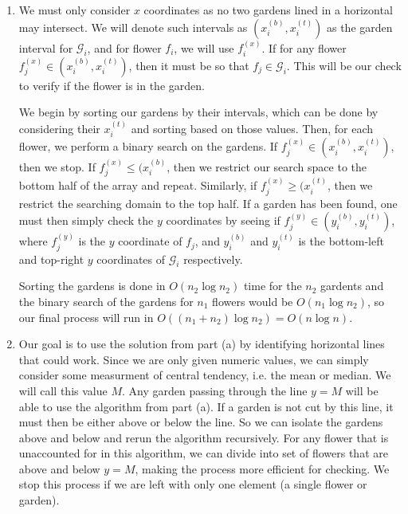 \documentclass{article}
\begin{document}
\begin{solution}
\begin{enumerate}[label = (\alph*)]
    \item We must only consider $x$ coordinates as no two gardens lined in a horizontal may intersect. We will denote such intervals as $(x_i^{(b)}, x_i^{(t)})$ as the garden interval for $\mathcal G_i$, and for flower $f_i$, we will use $f^{(x)}_i$. If for any flower $f_j^{(x)} \in (x_i^{(b)}, x_i^{(t)})$, then it must be so that $f_j \in \mathcal{G}_i$. This will be our check to verify if the flower is in the garden.

We begin by sorting our gardens by their intervals, which can be done by considering their $x^{(t)}_i$ and sorting based on those values. Then, for each flower, we perform a binary search on the gardens. If $f_j^{(x)} \in (x_i^{(b)}, x_i^{(t)})$, then we stop. If $f_j^{(x)}  \leq (x_i^{(b)}$, then we restrict our search space to the bottom half of the array and repeat. Similarly, if $f_j^{(x)}  \geq (x_i^{(t)}$, then we restrict the searching domain to the top half. If a garden has been found, one must then simply check the $y$ coordinates by seeing if $f_j^{(y)} \in (y_i^{(b)}, y_i^{(t)})$, where $f_j^{(y)}$ is the $y$ coordinate of $f_j$, and $y_i^{(b)}$ and $y_i^{(t)}$ is the bottom-left and top-right $y$ coordinates of $\mathcal{G}_i$ respectively.

Sorting the gardens is done in $O(n_2 \log n_2)$ time for the $n_2$ gardents and the binary search of the gardens for $n_1$ flowers would be $O(n_1 \log n_2)$, so our final process will run in $O\left( (n_1 + n_2) \log n_2\right) = O\left( n \log n\right)$.

    \item Our goal is to use the solution from part (a) by identifying horizontal lines that could work. Since we are only given numeric values, we can simply consider some measurment of central tendency, i.e. the mean or median. We will call this value $M$. Any garden passing through the line $y = M$ will be able to use the algorithm from part (a). If a garden is not cut by this line, it must then be either above or below the line. So we can isolate the gardens above and below and rerun the algorithm recursively. For any flower that is unaccounted for in this algorithm, we can divide into set of flowers that are above and below $y = M$, making the process more efficient for checking. We stop this process if we are left with only one element (a single flower or garden).


\end{enumerate}
\end{solution}
\end{document}
